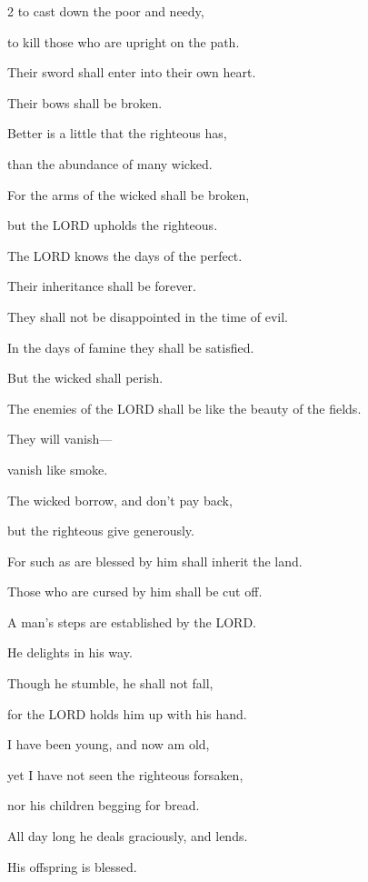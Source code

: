 \begin{multicols}{2}
	to cast down the poor and needy,
	
	to kill those who are upright on the path.
	
	
	\myverse{}Their sword shall enter into their own heart.
	
	Their bows shall be broken.
	
	
	\myverse{}Better is a little that the righteous has,
	
	than the abundance of many wicked.
	
	
	\myverse{}For the arms of the wicked shall be broken,
	
	but the LORD upholds the righteous.
	
	
	\myverse{}The LORD knows the days of the perfect.
	
	Their inheritance shall be forever.
	
	
	\myverse{}They shall not be disappointed in the time of evil.
	
	In the days of famine they shall be satisfied.
	
	\vspace{\baselineskip}
	
	\myverse{}But the wicked shall perish.
	
	The enemies of the LORD shall be like the beauty of the fields.
	
	They will vanish---
	
	vanish like smoke.
	
	
	\myverse{}The wicked borrow, and don’t pay back,
	
	but the righteous give generously.
	
	
	\myverse{}For such as are blessed by him shall inherit the land.
	
	Those who are cursed by him shall be cut off.
	
	
	\myverse{}A man’s steps are established by the LORD.
	
	He delights in his way.
	
	
	\myverse{}Though he stumble, he shall not fall,
	
	for the LORD holds him up with his hand.
	
	
	\myverse{}I have been young, and now am old,
	
	yet I have not seen the righteous forsaken,
	
	nor his children begging for bread.
	
	
	\myverse{}All day long he deals graciously, and lends.
	
	His offspring is blessed.
	

\end{multicols}
